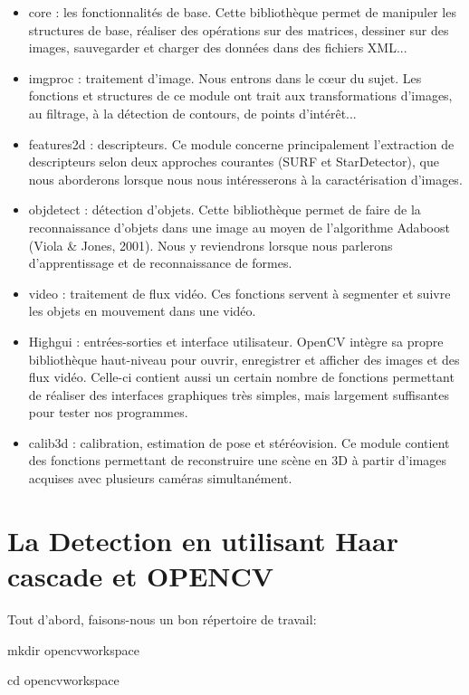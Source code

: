 \documentclass[11pt]{report}
\begin{document}
\begin{itemize}


\item
core : les fonctionnalités de base.
Cette bibliothèque permet de manipuler les structures de base, réaliser des
opérations sur des matrices, dessiner sur des images, sauvegarder et charger des
données dans des fichiers XML...
\item 
imgproc : traitement d'image.
Nous entrons dans le cœur du sujet. Les fonctions et structures de ce module ont
trait aux transformations d'images, au filtrage, à la détection de contours, de points
d'intérêt...
\item 
features2d : descripteurs.
Ce module concerne principalement l'extraction de descripteurs selon deux
approches courantes (SURF et StarDetector), que nous aborderons lorsque nous nous
intéresserons à la caractérisation d'images.
\item 
objdetect : détection d'objets.
Cette bibliothèque permet de faire de la reconnaissance d'objets dans une image au
moyen de l'algorithme Adaboost (Viola \& Jones, 2001). Nous y reviendrons lorsque
nous parlerons d'apprentissage et de reconnaissance de formes.
\item 
video : traitement de flux vidéo.
Ces fonctions servent à segmenter et suivre les objets en mouvement dans une
vidéo.

\item Highgui : entrées-sorties et interface utilisateur.
OpenCV intègre sa propre bibliothèque haut-niveau pour ouvrir, enregistrer et
afficher des images et des flux vidéo. Celle-ci contient aussi un certain nombre de
fonctions permettant de réaliser des interfaces graphiques très simples, mais
largement suffisantes pour tester nos programmes.
\item 
calib3d : calibration, estimation de pose et stéréovision.
Ce module contient des fonctions permettant de reconstruire une scène en 3D à
partir d'images acquises avec plusieurs caméras simultanément.
\end{itemize}

\section{La Detection en utilisant Haar cascade et OPENCV}

Tout d'abord, faisons-nous un bon répertoire de travail:

mkdir opencvworkspace

cd opencvworkspace
\end{document}
